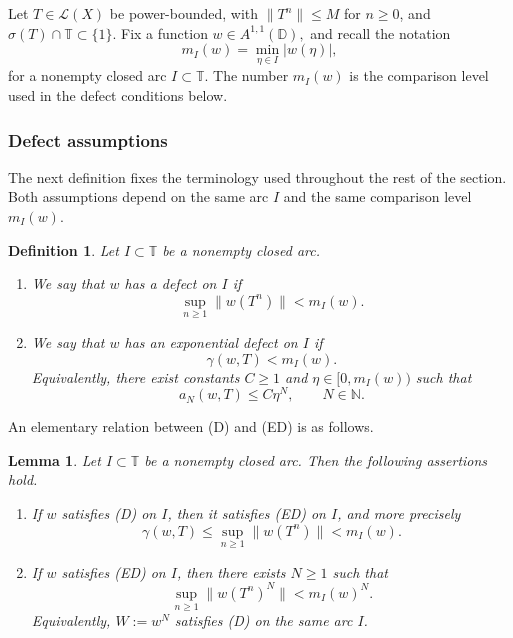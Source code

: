 \documentclass[11pt]{amsart}
\numberwithin{equation}{section}
\newtheorem{lemma}[theorem]{Lemma}
\newtheorem{definition}[theorem]{Definition}
\theoremstyle{definition}
\theoremstyle{plain}
\def\N{\mathbb{N}}
\def\T{\mathbb{T}}
\def\L{L}
\def\D{\mathbb{D}}
\renewcommand{\L}{\mathcal L}
\begin{document}
Let $T\in\L(X)$ be power-bounded, with $\|T^n\|\le M$ for $n\ge0$, and
$\sigma(T)\cap \mathbb T \subset \{1\}$.
Fix a function $w\in A^{1,1}(\D),$ and recall the notation
\[
  m_I(w)=\min_{\eta\in I}|w(\eta)|,
\]
for a nonempty closed arc $I\subset\T.$
The number \(m_I(w)\) is the comparison level used in the defect
conditions below.


\subsubsection{Defect assumptions}

The next definition fixes the terminology used throughout the rest of the section.
Both assumptions depend on the same arc $I$ and the same comparison level
$m_I(w)$.

\begin{definition}\label{def:defects}
Let \(I\subset\T\) be a nonempty closed arc.
\begin{enumerate}
\item[(D)] We say that \(w\) has a \emph{defect on \(I\)} if
\[
   \sup_{n\ge1}\|w(T^n)\|<m_I(w).
\]

\item[(ED)] We say that \(w\) has an \emph{exponential defect on \(I\)} if
\[
   \gamma(w,T)<m_I(w).
\]
Equivalently, there exist constants \(C\ge1\) and
\(\eta\in[0,m_I(w))\) such that
\[
   a_N(w,T)\le C\eta^N,\qquad N\in\N.
\]
\end{enumerate}
\end{definition}

An elementary relation between \textup{(D)} and \textup{(ED)} is as follows.
\begin{lemma}\label{lem:D-ED-rel}
Let $I\subset\T$ be a nonempty closed arc. Then the following assertions hold.
\begin{enumerate}
\item[(i)] If $w$ satisfies \textup{(D)} on $I$, then it satisfies \textup{(ED)} on
$I$, and more precisely
\[
   \gamma(w,T)\le \sup_{n\ge1}\|w(T^n)\|<m_I(w).
\]

\item[(ii)] If $w$ satisfies \textup{(ED)} on $I$, then there exists $N\ge1$ such that
\[
   \sup_{n\ge1}\|w(T^n)^N\|<m_I(w)^N.
\]
Equivalently, $W:=w^N$ satisfies \textup{(D)} on the same arc $I$.
\end{enumerate}
\end{lemma}
\end{document}
